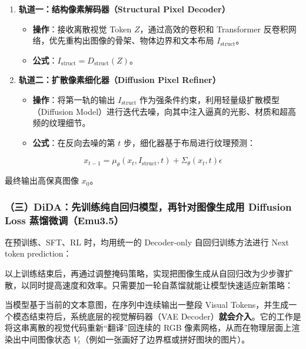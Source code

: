 \begin{enumerate}
\def\labelenumi{\arabic{enumi}.}
\item
  \textbf{轨道一：结构像素解码器（Structural Pixel Decoder）}

  \begin{itemize}
  \tightlist
  \item
    \textbf{操作}：接收离散视觉 Token \(Z\)，通过高效的卷积和 Transformer 反卷积网络，优先重构出图像的骨架、物体边界和文本布局 \(I_{\mathrm{struct}}\)。
  \item
    \textbf{公式}：\(I_{\mathrm{struct}}=D_{\mathrm{struct}}(Z)\)。
  \end{itemize}
\item
  \textbf{轨道二：扩散像素细化器（Diffusion Pixel Refiner）}

  \begin{itemize}
  \tightlist
  \item
    \textbf{操作}：将第一轨的输出 \(I_{\mathrm{struct}}\) 作为强条件约束，利用轻量级扩散模型（Diffusion Model）进行迭代去噪，向其中注入逼真的光影、材质和超高频的纹理细节。
  \item
    \textbf{公式}：在反向去噪的第 \(t\) 步，细化器基于布局进行纹理预测：
  \end{itemize}
\end{enumerate}

\[
x_{t-1}=\mu_{\theta}(x_t,I_{\mathrm{struct}},t)+\Sigma_{\theta}(x_t,t)\epsilon
\]

最终输出高保真图像 \(x_0\)。

\hypertarget{ux4e09didaux5148ux8badux7ec3ux7eafux81eaux56deux5f52ux6a21ux578bux518dux9488ux5bf9ux56feux50cfux751fux6210ux7528-diffusion-loss-ux84b8ux998fux5faeux8c03emu3.5}{%
\subsubsection{（三）DiDA：先训练纯自回归模型，再针对图像生成用 Diffusion Loss 蒸馏微调（Emu3.5）}\label{ux4e09didaux5148ux8badux7ec3ux7eafux81eaux56deux5f52ux6a21ux578bux518dux9488ux5bf9ux56feux50cfux751fux6210ux7528-diffusion-loss-ux84b8ux998fux5faeux8c03emu3.5}}

在预训练、SFT、RL 时，均用统一的 Decoder-only 自回归训练方法进行 Next token prediction：

以上训练结束后，再通过调整掩码策略，实现把图像生成从自回归改为少步骤扩散，以同时提高速度和效率。只需要加一轮自蒸馏就能让模型快速适应新策略：

当模型基于当前的文本意图，在序列中连续输出一整段 Visual Tokens，并生成一个模态结束符后，系统底层的视觉解码器（VAE Decoder）\textbf{就会介入}。它的工作是将这串离散的视觉代码重新``翻译''回连续的 RGB 像素网格，从而在物理层面上渲染出中间图像状态 \(V_t\)（例如一张画好了边界框或拼好图块的图片）。

